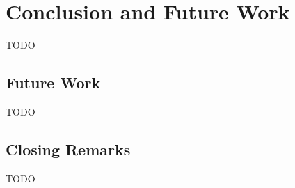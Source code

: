 \chapter{Conclusion and Future Work}
\label{cha:conclusion_and_future_work}

TODO

\section{Future Work}
\label{sec:future_work}

TODO

\section{Closing Remarks}
\label{sec:closing_remarks}

TODO

